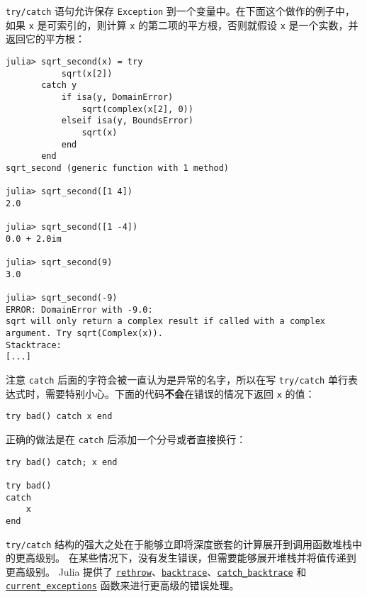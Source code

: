 \texttt{try/catch} 语句允许保存 \texttt{Exception} 到一个变量中。在下面这个做作的例子中，如果 \texttt{x} 是可索引的，则计算 \texttt{x} 的第二项的平方根，否则就假设 \texttt{x} 是一个实数，并返回它的平方根：




\begin{verbatim}
julia> sqrt_second(x) = try
           sqrt(x[2])
       catch y
           if isa(y, DomainError)
               sqrt(complex(x[2], 0))
           elseif isa(y, BoundsError)
               sqrt(x)
           end
       end
sqrt_second (generic function with 1 method)

julia> sqrt_second([1 4])
2.0

julia> sqrt_second([1 -4])
0.0 + 2.0im

julia> sqrt_second(9)
3.0

julia> sqrt_second(-9)
ERROR: DomainError with -9.0:
sqrt will only return a complex result if called with a complex argument. Try sqrt(Complex(x)).
Stacktrace:
[...]
\end{verbatim}



注意 \texttt{catch} 后面的字符会被一直认为是异常的名字，所以在写 \texttt{try/catch} 单行表达式时，需要特别小心。下面的代码\textbf{不会}在错误的情况下返回 \texttt{x} 的值：




\begin{verbatim}
try bad() catch x end
\end{verbatim}



正确的做法是在 \texttt{catch} 后添加一个分号或者直接换行：




\begin{verbatim}
try bad() catch; x end

try bad()
catch
    x
end
\end{verbatim}



\texttt{try/catch} 结构的强大之处在于能够立即将深度嵌套的计算展开到调用函数堆栈中的更高级别。 在某些情况下，没有发生错误，但需要能够展开堆栈并将值传递到更高级别。 Julia 提供了 \hyperlink{2102349972401293064}{\texttt{rethrow}}、\hyperlink{6187626674327343338}{\texttt{backtrace}}、\hyperlink{98342946516168163}{\texttt{catch\_backtrace}} 和 \href{@ref}{\texttt{current\_exceptions}} 函数来进行更高级的错误处理。



\hypertarget{13560047635024894791}{}


